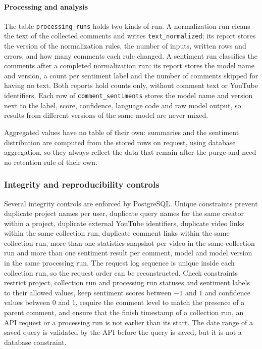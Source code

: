 \paragraph{Processing and analysis}

The table \texttt{processing\_runs} holds two kinds of run. A normalization run cleans the text of the collected comments and writes \texttt{text\_\allowbreak normalized}; its report stores the version of the normalization rules, the number of inputs, written rows and errors, and how many comments each rule changed. A sentiment run classifies the comments after a completed normalization run; its report stores the model name and version, a count per sentiment label and the number of comments skipped for having no text. Both reports hold counts only, without comment text or YouTube identifiers. Each row of \texttt{comment\_sentiments} stores the model name and version next to the label, score, confidence, language code and raw model output, so results from different versions of the same model are never mixed.

Aggregated values have no table of their own: summaries and the sentiment distribution are computed from the stored rows on request, using database aggregation, so they always reflect the data that remain after the purge and need no retention rule of their own.

\subsubsection{Integrity and reproducibility controls}

Several integrity controls are enforced by PostgreSQL. Unique constraints prevent duplicate project names per user, duplicate query names for the same creator within a project, duplicate external YouTube identifiers, duplicate video links within the same collection run, duplicate comment links within the same collection run, more than one statistics snapshot per video in the same collection run and more than one sentiment result per comment, model and model version in the same processing run. The request log sequence is unique inside each collection run, so the request order can be reconstructed. Check constraints restrict project, collection run and processing run statuses and sentiment labels to their allowed values, keep sentiment scores between $-1$ and $1$ and confidence values between $0$ and $1$, require the comment level to match the presence of a parent comment, and ensure that the finish timestamp of a collection run, an API request or a processing run is not earlier than its start. The date range of a saved query is validated by the API before the query is saved, but it is not a database constraint.

